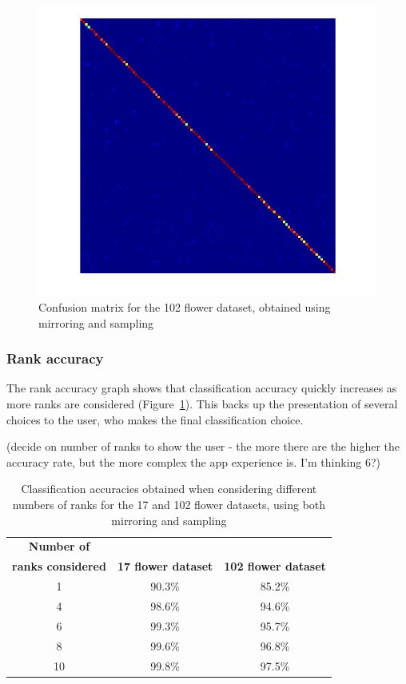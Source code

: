 \documentclass[11pt, a4paper]{report}
\begin{document}
\begin{figure}[hbt]
	\centering
  \includegraphics[totalheight=15cm]{img/16.png}
  \caption{Confusion matrix for the 102 flower dataset, obtained using mirroring and sampling}
  \label{img:16}
\end{figure}

\subsubsection{Rank accuracy}

The rank accuracy graph shows that classification accuracy quickly increases as more ranks are considered (Figure~\ref{table:rank}). This backs up the presentation of several choices to the user, who makes the final classification choice. 


(decide on number of ranks to show the user - the more there are the higher the accuracy rate, but the more complex the app experience is. I'm thinking 6?)  





\begin{table}[h]
\centering 
\renewcommand{\arraystretch}{1.3}
\begin{tabular}{c|cc}
  {\bf Number of}\\ {\bf ranks considered} & {\bf 17 flower dataset} & {\bf 102 flower dataset} \\
  \hline
  1 & 90.3\% & 85.2\% \\
  4 & 98.6\% & 94.6\% \\
  6 & 99.3\% & 95.7\% \\
  8 & 99.6\% & 96.8\% \\
  10 & 99.8\% & 97.5\% 
\end{tabular}
\renewcommand{\arraystretch}{1}
\caption{Classification accuracies obtained when considering different numbers of ranks for the 17 and 102 flower datasets, using both mirroring and sampling}
\label{table:rank}
\end{table}
\end{document}
